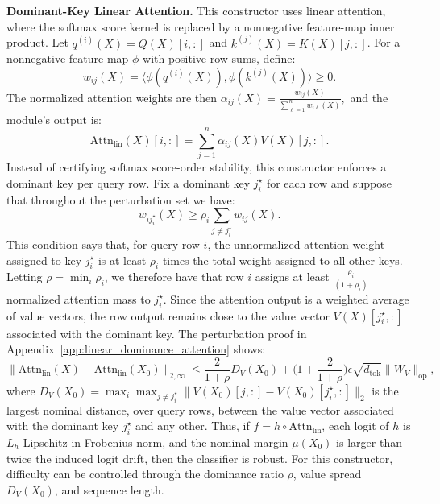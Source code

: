 \documentclass{article}
\theoremstyle{definition}
\begin{document}
\textbf{Dominant-Key Linear Attention.}
This constructor uses linear attention, where the softmax score kernel is replaced by a nonnegative feature-map inner product. Let $q^{(i)}(X)=Q(X)[i,:]$ and $k^{(j)}(X)=K(X)[j,:]$. For a nonnegative feature map $\phi$ with positive row sums, define:
\begin{equation}
    w_{ij}(X)=
    \langle \phi(q^{(i)}(X)),\phi(k^{(j)}(X))\rangle
    \geq 0.
\end{equation}
The normalized attention weights are then $
    \alpha_{ij}(X)
    =
    \frac{w_{ij}(X)}{\sum_{\ell=1}^n w_{i\ell}(X)},
$ and the %
module's output is:
\begin{equation}
    \mathrm{Attn}_{\mathrm{lin}}(X)[i,:]
    =
    \sum_{j=1}^n \alpha_{ij}(X)V(X)[j,:].
    \label{eq:linear_attention_map}
\end{equation}
%
Instead of certifying softmax score-order stability, this constructor enforces a dominant key %
per query row. Fix a dominant key $j_i^\star$ for each row and suppose that throughout the perturbation set we have: 
\begin{equation}
    w_{i j_i^\star}(X)
    \geq
    \rho_i \sum_{j\neq j_i^\star} w_{ij}(X).
    \label{eq:linear_attention_dominance}
\end{equation}
This condition says that, for query row $i$, the unnormalized attention weight assigned to key $j_i^\star$ is at least $\rho_i$ times the total weight assigned to all other keys. 
Letting $\rho=\min_i\rho_i$, we therefore have that row $i$ assigns at least $\frac{\rho_i}{(1+\rho_i)}$ normalized attention mass to $j_i^\star$. 
Since the attention output is a weighted average of value vectors, the row output remains close to the value vector $V(X)[j_i^\star,:]$ associated with the dominant key. 
The perturbation proof in Appendix~\ref{app:linear_dominance_attention} shows: 
\begin{equation}
    \|\mathrm{Attn}_{\mathrm{lin}}(X)-\mathrm{Attn}_{\mathrm{lin}}(X_0)\|_{2,\infty}
    \leq
    \frac{2}{1+\rho}D_V(X_0)
    +
    \Big(1+\frac{2}{1+\rho}\Big)
    \epsilon\sqrt{d_{\mathrm{tok}}}\|W_V\|_{\mathrm{op}} ,
    \label{eq:linear_attention_bound}
\end{equation} 
where $D_V(X_0)=\max_i\max_{j\neq j_i^\star}\|V(X_0)[j,:]-V(X_0)[j_i^\star,:]\|_2$ is the largest nominal distance, over query rows, between the value vector associated with the dominant key $j_i^\star$ and any %
other. Thus, if $f=h\circ\mathrm{Attn}_{\mathrm{lin}}$, each logit of $h$ is $L_h$-Lipschitz %
in Frobenius norm, and the nominal margin $\mu(X_0)$ is larger than twice the induced logit drift, then the classifier is robust. For this constructor, difficulty can be controlled through the dominance ratio $\rho$, value spread $D_V(X_0)$, and sequence length. 
\end{document}
